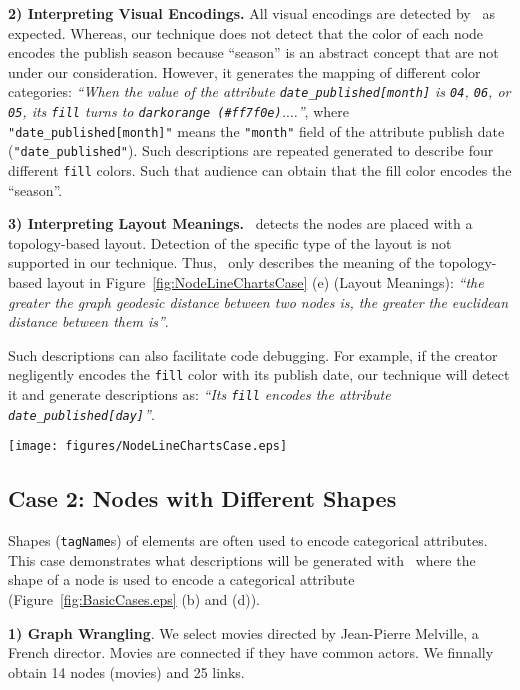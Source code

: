 \textbf{2) Interpreting Visual Encodings.} All visual encodings are detected by \ApproachName~as expected.
Whereas, our technique does not detect that the color of each node encodes the publish season because ``season'' is an abstract concept that are not under our consideration.
However, it generates the mapping of different color categories: 
\textit{``When the value of the attribute {\texttt{date\_published[month]}} is {\texttt{04}}, {\texttt{06}}, or {\texttt{05}}, 
its {\texttt{fill}} turns to {\texttt{darkorange (\#ff7f0e)}}.$\ldots$''}, 
where \texttt{"date\_published[month]"} means the \texttt{"month"} field of the attribute publish date (\texttt{"date\_published"}).
Such descriptions are repeated generated to describe four different \texttt{fill} colors.
Such that audience can obtain that the fill color encodes the ``season''.

\textbf{3) Interpreting Layout Meanings.} \ApproachName~detects the nodes are placed with a topology-based layout. 
Detection of the specific type of the layout is not supported in our technique.
Thus, \ApproachName~only describes the meaning of the topology-based layout in Figure~\ref{fig:NodeLineChartsCase} (e) (Layout Meanings): \textit{``the greater the graph geodesic distance between two nodes is, the greater the euclidean distance between them is''}.

Such descriptions can also facilitate code debugging. 
For example, if the creator negligently encodes the \texttt{fill} color with its publish date,
our technique will detect it and generate descriptions as: \textit{``Its \texttt{fill} encodes the attribute \texttt{date\_published[day]}''}.

\begin{figure*}[ht]
    \centering
    \setlength{\belowcaptionskip}{-5pt}
    \texttt{[image: figures/NodeLineChartsCase.eps]}
    \caption{xxx}
    \label{fig:NodeLineChartsCase}
\end{figure*}

\subsection{Case 2: Nodes with Different Shapes}
Shapes (\texttt{tagName}s) of elements are often used to encode categorical attributes.
This case demonstrates what descriptions will be generated with \ApproachName~where the shape of a node is used to encode a categorical attribute (Figure~\ref{fig:BasicCases.eps} (b) and (d)).

\textbf{1) Graph Wrangling}. 
We select movies directed by Jean-Pierre Melville, a French director. 
Movies are connected if they have common actors. 
We finnally obtain 14 nodes (movies) and 25 links.

